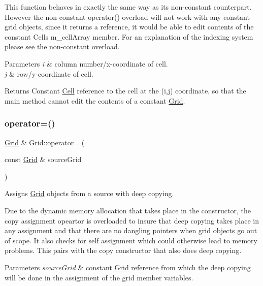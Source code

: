 This function behaves in exactly the same way as its non-\/constant counterpart. However the non-\/constant operator() overload will not work with any constant grid objects, since it returns a reference, it would be able to edit contents of the constant Cells m\+\_\+cell\+Array member. For an explanation of the indexing system please see the non-\/constant overload.


\begin{DoxyParams}{Parameters}
{\em i} & column number/x-\/coordinate of cell. \\
\hline
{\em j} & row/y-\/coordinate of cell.\\
\hline
\end{DoxyParams}
\begin{DoxyReturn}{Returns}
Constant \hyperlink{class_cell}{Cell} reference to the cell at the (i,j) coordinate, so that the main method cannot edit the contents of a constant \hyperlink{class_grid}{Grid}. 
\end{DoxyReturn}
\mbox{\label{class_grid_aae7b118be13f65bf2e3a72881d8a06df}} 
\subsubsection{\texorpdfstring{operator=()}{operator=()}\hspace{0.1cm}{\footnotesize\ttfamily [1/2]}}
{\footnotesize\ttfamily \hyperlink{class_grid}{Grid} \& Grid\+::operator= (\begin{DoxyParamCaption}\item[{const \hyperlink{class_grid}{Grid} \&}]{source\+Grid }\end{DoxyParamCaption})}



Assigns \hyperlink{class_grid}{Grid} objects from a source with deep copying. 

Due to the dynamic memory allocation that takes place in the constructor, the copy assignment opeartor is overloaded to insure that deep copying takes place in any assignment and that there are no dangling pointers when grid objects go out of scope. It also checks for self assignment which could otherwise lead to memory problems. This pairs with the copy constructor that also does deep copying.


\begin{DoxyParams}{Parameters}
{\em source\+Grid} & constant \hyperlink{class_grid}{Grid} reference from which the deep copying will be done in the assignment of the grid member variables. \\
\hline
\end{DoxyParams}
\mbox{\label{class_grid_a9f84434eb37abc5cd0979cd609b2a2d8}} 
